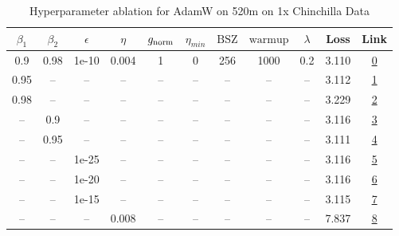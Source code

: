 \begin{table}[H]
\centering
\caption{Hyperparameter ablation for AdamW on 520m on 1x Chinchilla Data}
\label{tab:ablation_adamw_520m_on_1x_chinchilla_data}
\begin{tabular}{ccccccccccc}
\toprule
$\beta_1$ & $\beta_2$ & $\epsilon$ & $\eta$ & $g_{\mathrm{norm}}$ & $\eta_{min}$ & $\mathrm{BSZ}$ & $\mathrm{warmup}$ & $\lambda$ & Loss & Link \\
\midrule
0.9 & 0.98 & 1e-10 & 0.004 & 1 & 0 & 256 & 1000 & 0.2 & 3.110 & \href{https://wandb.ai/marin-community/optimizer-scaling/runs/sweep-520m-10B-adamwf7a9c6lr0.004-wd0.2-minlr0-warmup1000-b10.9--0a09ef}{0} \\
\midrule
0.95 & -- & -- & -- & -- & -- & -- & -- & -- & 3.112 & \href{https://wandb.ai/marin-community/optimizer-scaling/runs/sweep-520m-10B-adamw92fab3lr0.004-wd0.2-minlr0-warmup1000-b10.95-b52d40}{1} \\
0.98 & -- & -- & -- & -- & -- & -- & -- & -- & 3.229 & \href{https://wandb.ai/marin-community/optimizer-scaling/runs/sweep-520m-10B-adamw757dfblr0.004-wd0.2-minlr0-warmup1000-b10.98-82eb00}{2} \\
-- & 0.9 & -- & -- & -- & -- & -- & -- & -- & 3.116 & \href{https://wandb.ai/marin-community/optimizer-scaling/runs/sweep-520m-10B-adamw2399bdlr0.004-wd0.2-minlr0-warmup1000-b10.9--235c9f}{3} \\
-- & 0.95 & -- & -- & -- & -- & -- & -- & -- & 3.111 & \href{https://wandb.ai/marin-community/optimizer-scaling/runs/sweep-520m-10B-adamw49b619lr0.004-wd0.2-minlr0-warmup1000-b10.9--0339de}{4} \\
-- & -- & 1e-25 & -- & -- & -- & -- & -- & -- & 3.116 & \href{https://wandb.ai/marin-community/optimizer-scaling/runs/sweep-520m-10B-adamwe08492lr0.004-wd0.2-minlr0-warmup1000-b10.9--550b0a}{5} \\
-- & -- & 1e-20 & -- & -- & -- & -- & -- & -- & 3.116 & \href{https://wandb.ai/marin-community/optimizer-scaling/runs/sweep-520m-10B-adamw920b54lr0.004-wd0.2-minlr0-warmup1000-b10.9--29bc56}{6} \\
-- & -- & 1e-15 & -- & -- & -- & -- & -- & -- & 3.115 & \href{https://wandb.ai/marin-community/optimizer-scaling/runs/sweep-520m-10B-adamwc8444flr0.004-wd0.2-minlr0-warmup1000-b10.9--ad8761}{7} \\
-- & -- & -- & 0.008 & -- & -- & -- & -- & -- & 7.837 & \href{https://wandb.ai/marin-community/optimizer-scaling/runs/sweep-520m-10B-adamw6dd5c1lr0.008-wd0.2-minlr0-warmup1000-b10.9--2c3f20}{8} \\

\end{tabular}
\end{table}
